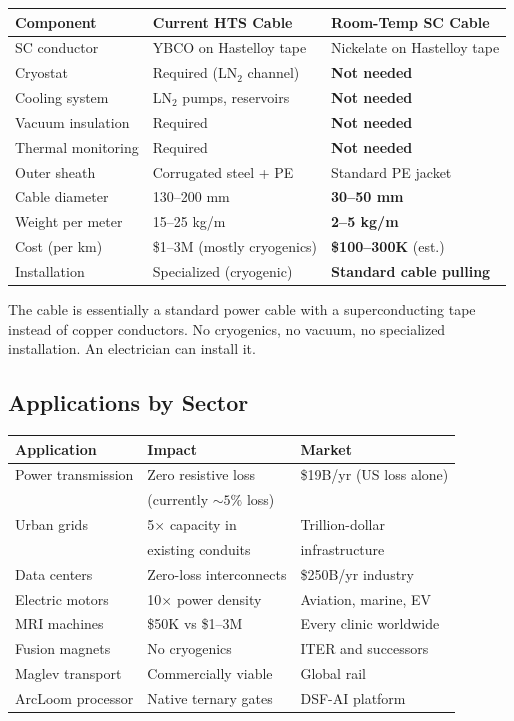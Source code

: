 \documentclass[11pt, a4paper]{article}
\begin{document}
\begin{center}
\begin{tabular}{@{}lll@{}}
\toprule
\textbf{Component} & \textbf{Current HTS Cable} & \textbf{Room-Temp SC Cable} \\
\midrule
SC conductor & YBCO on Hastelloy tape & Nickelate on Hastelloy tape \\
Cryostat & Required (LN$_2$ channel) & \textbf{Not needed} \\
Cooling system & LN$_2$ pumps, reservoirs & \textbf{Not needed} \\
Vacuum insulation & Required & \textbf{Not needed} \\
Thermal monitoring & Required & \textbf{Not needed} \\
Outer sheath & Corrugated steel + PE & Standard PE jacket \\
Cable diameter & 130--200 mm & \textbf{30--50 mm} \\
Weight per meter & 15--25 kg/m & \textbf{2--5 kg/m} \\
Cost (per km) & \$1--3M (mostly cryogenics) & \textbf{\$100--300K} (est.) \\
Installation & Specialized (cryogenic) & \textbf{Standard cable pulling} \\
\bottomrule
\end{tabular}
\end{center}

The cable is essentially a standard power cable with a
superconducting tape instead of copper conductors. No cryogenics,
no vacuum, no specialized installation. An electrician can
install it.

\subsection{Applications by Sector}

\begin{center}
\begin{tabular}{@{}lll@{}}
\toprule
\textbf{Application} & \textbf{Impact} & \textbf{Market} \\
\midrule
Power transmission & Zero resistive loss & \$19B/yr (US loss alone) \\
 & (currently $\sim 5\%$ loss) & \\
Urban grids & 5$\times$ capacity in & Trillion-dollar \\
 & existing conduits & infrastructure \\
Data centers & Zero-loss interconnects & \$250B/yr industry \\
Electric motors & 10$\times$ power density & Aviation, marine, EV \\
MRI machines & \$50K vs \$1--3M & Every clinic worldwide \\
Fusion magnets & No cryogenics & ITER and successors \\
Maglev transport & Commercially viable & Global rail \\
ArcLoom processor & Native ternary gates & DSF-AI platform \\
\bottomrule
\end{tabular}
\end{center}
\end{document}
